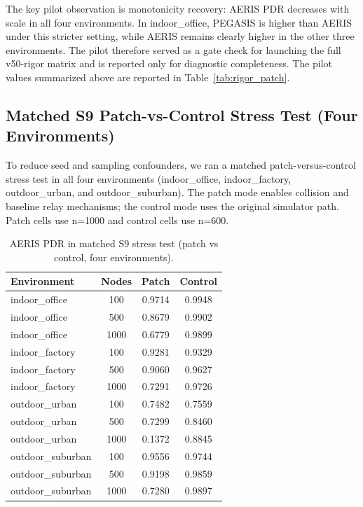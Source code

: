 ﻿\documentclass[sensors,article,submit,moreauthors,pdftex]{Definitions/mdpi}
\begin{document}
The key pilot observation is monotonicity recovery: AERIS PDR decreases with scale in all four environments. In indoor\_office, PEGASIS is higher than AERIS under this stricter setting, while AERIS remains clearly higher in the other three environments. The pilot therefore served as a gate check for launching the full v50-rigor matrix and is reported only for diagnostic completeness.
The pilot values summarized above are reported in Table~\ref{tab:rigor_patch}.

\subsection{Matched S9 Patch-vs-Control Stress Test (Four Environments)}
To reduce seed and sampling confounders, we ran a matched patch-versus-control stress test in all four environments (indoor\_office, indoor\_factory, outdoor\_urban, and outdoor\_suburban). The patch mode enables collision and baseline relay mechanisms; the control mode uses the original simulator path. Patch cells use n=1000 and control cells use n=600.

\begin{table}[H]
\caption{AERIS PDR in matched S9 stress test (patch vs control, four environments).}
\label{tab:s9_patch_control}
\centering
\begin{tabular}{lccc}
\toprule
Environment & Nodes & Patch & Control \\
\midrule
indoor\_office & 100  & 0.9714 & 0.9948 \\
indoor\_office & 500  & 0.8679 & 0.9902 \\
indoor\_office & 1000 & 0.6779 & 0.9899 \\
indoor\_factory & 100  & 0.9281 & 0.9329 \\
indoor\_factory & 500  & 0.9060 & 0.9627 \\
indoor\_factory & 1000 & 0.7291 & 0.9726 \\
outdoor\_urban & 100  & 0.7482 & 0.7559 \\
outdoor\_urban & 500  & 0.7299 & 0.8460 \\
outdoor\_urban & 1000 & 0.1372 & 0.8845 \\
outdoor\_suburban & 100  & 0.9556 & 0.9744 \\
outdoor\_suburban & 500  & 0.9198 & 0.9859 \\
outdoor\_suburban & 1000 & 0.7280 & 0.9897 \\
\bottomrule
\end{tabular}
\end{table}
\end{document}
